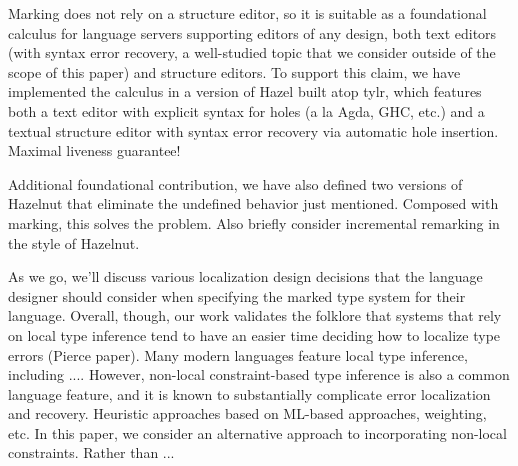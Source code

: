 Marking does not rely on a structure editor, so it is suitable as a foundational calculus for language servers supporting editors of any 
design, both text editors (with syntax error recovery, a well-studied topic that we consider outside of the scope of this paper) and structure editors. To support this claim, we have implemented the calculus in a version of Hazel built atop tylr, which features both a text editor with explicit syntax for holes (a la Agda, GHC, etc.) and a textual structure editor with syntax error recovery via automatic hole insertion. Maximal liveness guarantee! 

Additional foundational contribution, we have also defined two versions of Hazelnut that eliminate the undefined behavior just mentioned. Composed with marking, this solves the problem. Also briefly consider incremental remarking in the style of Hazelnut.

As we go, we'll discuss various localization design decisions that the language designer should consider when specifying the marked type system for their language. Overall, though, our work validates the folklore that systems that rely on local type inference tend to have an easier time deciding how to localize type errors (Pierce paper). Many modern languages feature local type inference, including .... 
However, non-local constraint-based type inference is also a common language feature, and it is known to substantially complicate error localization and recovery. 
Heuristic approaches based on ML-based approaches, weighting, etc.
In this paper, we consider an alternative approach to incorporating non-local constraints. Rather than ...

